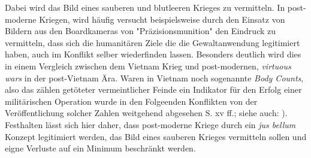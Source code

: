 \documentclass[11pt,a4paper,oneside,numbers=noenddot,bibliography=totocnumbered,DIV=13]{scrartcl}
\begin{document}
Dabei wird das Bild eines sauberen und blutleeren Krieges zu vermitteln. In post-moderne Kriegen, wird häufig versucht beispielsweise durch den Einsatz von Bildern aus den Boardkameras von "Präzisionsmunition" den Eindruck zu vermitteln, dass sich die humanitären Ziele die die Gewaltanwendung legitimiert haben, auch im Konflikt selber wiederfinden lassen. Besonders deutlich wird dies in einem Vergleich zwischen dem Vietnam Krieg und post-modernen, \textit{virtuous wars} in der post-Vietnam Ära. Waren in Vietnam noch sogenannte \textit{Body Counts}, also das zählen getöteter vermeintlicher Feinde ein Indikator für den Erfolg einer militärischen Operation wurde in den Folgeenden Konflikten von der Veröffentlichung solcher Zahlen weitgehend abgesehen \cite{DerDerian2001} S. xv ff.; siehe auch: \cite{graham_enemy_2005}).\\
Festhalten lässt sich hier daher, dass post-moderne Kriege durch ein \textit{jus bellum} Konzept legitimiert werden, das Bild eines sauberen Krieges vermitteln sollen und eigne Verluste auf ein Minimum beschränkt werden.
\end{document}
